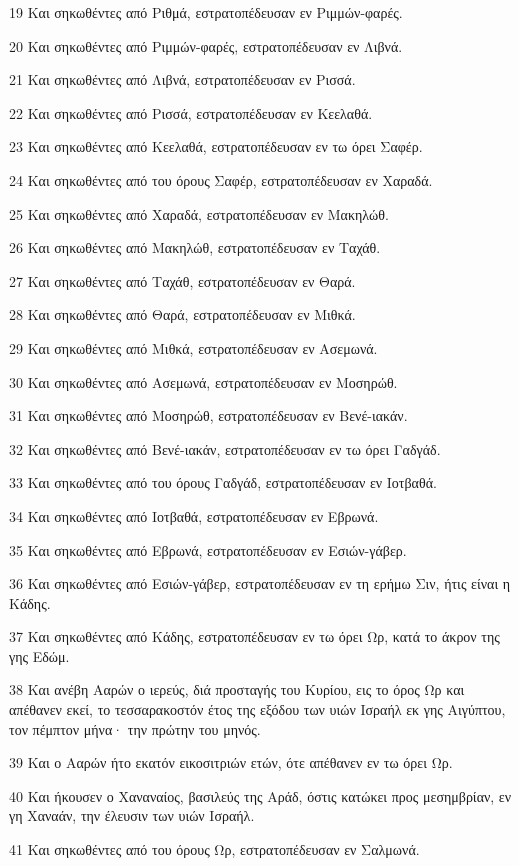 \par 19 Και σηκωθέντες από Ριθμά, εστρατοπέδευσαν εν Ριμμών-φαρές.
\par 20 Και σηκωθέντες από Ριμμών-φαρές, εστρατοπέδευσαν εν Λιβνά.
\par 21 Και σηκωθέντες από Λιβνά, εστρατοπέδευσαν εν Ρισσά.
\par 22 Και σηκωθέντες από Ρισσά, εστρατοπέδευσαν εν Κεελαθά.
\par 23 Και σηκωθέντες από Κεελαθά, εστρατοπέδευσαν εν τω όρει Σαφέρ.
\par 24 Και σηκωθέντες από του όρους Σαφέρ, εστρατοπέδευσαν εν Χαραδά.
\par 25 Και σηκωθέντες από Χαραδά, εστρατοπέδευσαν εν Μακηλώθ.
\par 26 Και σηκωθέντες από Μακηλώθ, εστρατοπέδευσαν εν Ταχάθ.
\par 27 Και σηκωθέντες από Ταχάθ, εστρατοπέδευσαν εν Θαρά.
\par 28 Και σηκωθέντες από Θαρά, εστρατοπέδευσαν εν Μιθκά.
\par 29 Και σηκωθέντες από Μιθκά, εστρατοπέδευσαν εν Ασεμωνά.
\par 30 Και σηκωθέντες από Ασεμωνά, εστρατοπέδευσαν εν Μοσηρώθ.
\par 31 Και σηκωθέντες από Μοσηρώθ, εστρατοπέδευσαν εν Βενέ-ιακάν.
\par 32 Και σηκωθέντες από Βενέ-ιακάν, εστρατοπέδευσαν εν τω όρει Γαδγάδ.
\par 33 Και σηκωθέντες από του όρους Γαδγάδ, εστρατοπέδευσαν εν Ιοτβαθά.
\par 34 Και σηκωθέντες από Ιοτβαθά, εστρατοπέδευσαν εν Εβρωνά.
\par 35 Και σηκωθέντες από Εβρωνά, εστρατοπέδευσαν εν Εσιών-γάβερ.
\par 36 Και σηκωθέντες από Εσιών-γάβερ, εστρατοπέδευσαν εν τη ερήμω Σιν, ήτις είναι η Κάδης.
\par 37 Και σηκωθέντες από Κάδης, εστρατοπέδευσαν εν τω όρει Ωρ, κατά το άκρον της γης Εδώμ.
\par 38 Και ανέβη Ααρών ο ιερεύς, διά προσταγής του Κυρίου, εις το όρος Ωρ και απέθανεν εκεί, το τεσσαρακοστόν έτος της εξόδου των υιών Ισραήλ εκ γης Αιγύπτου, τον πέμπτον μήνα· την πρώτην του μηνός.
\par 39 Και ο Ααρών ήτο εκατόν εικοσιτριών ετών, ότε απέθανεν εν τω όρει Ωρ.
\par 40 Και ήκουσεν ο Χαναναίος, βασιλεύς της Αράδ, όστις κατώκει προς μεσημβρίαν, εν γη Χαναάν, την έλευσιν των υιών Ισραήλ.
\par 41 Και σηκωθέντες από του όρους Ωρ, εστρατοπέδευσαν εν Σαλμωνά.
